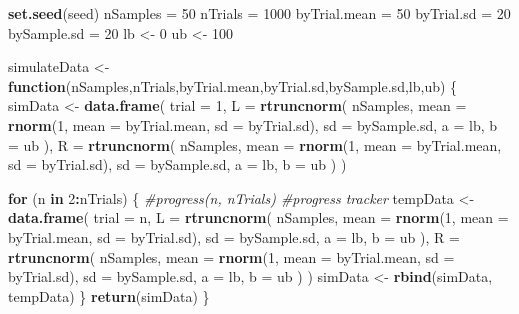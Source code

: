 \documentclass[
]{book}
\newenvironment{Shaded}{\begin{snugshade}}{\end{snugshade}}
\newcommand{\AttributeTok}[1]{\textcolor[rgb]{0.13,0.29,0.53}{#1}}
\newcommand{\CommentTok}[1]{\textcolor[rgb]{0.56,0.35,0.01}{\textit{#1}}}
\newcommand{\ControlFlowTok}[1]{\textcolor[rgb]{0.13,0.29,0.53}{\textbf{#1}}}
\newcommand{\DecValTok}[1]{\textcolor[rgb]{0.00,0.00,0.81}{#1}}
\newcommand{\FunctionTok}[1]{\textcolor[rgb]{0.13,0.29,0.53}{\textbf{#1}}}
\newcommand{\NormalTok}[1]{#1}
\newcommand{\OtherTok}[1]{\textcolor[rgb]{0.56,0.35,0.01}{#1}}
\newcommand{\SpecialCharTok}[1]{\textcolor[rgb]{0.81,0.36,0.00}{\textbf{#1}}}
\begin{document}
\begin{Shaded}
\begin{Highlighting}[]
\FunctionTok{set.seed}\NormalTok{(seed)}
\NormalTok{nSamples }\OtherTok{=} \DecValTok{50}
\NormalTok{nTrials }\OtherTok{=} \DecValTok{1000}
\NormalTok{byTrial.mean }\OtherTok{=} \DecValTok{50}
\NormalTok{byTrial.sd }\OtherTok{=} \DecValTok{20}
\NormalTok{bySample.sd }\OtherTok{=} \DecValTok{20}
\NormalTok{lb }\OtherTok{\textless{}{-}} \DecValTok{0}
\NormalTok{ub }\OtherTok{\textless{}{-}} \DecValTok{100}

\NormalTok{simulateData }\OtherTok{\textless{}{-}} \ControlFlowTok{function}\NormalTok{(nSamples,nTrials,byTrial.mean,byTrial.sd,bySample.sd,lb,ub) \{}
\NormalTok{  simData }\OtherTok{\textless{}{-}} \FunctionTok{data.frame}\NormalTok{(}
    \AttributeTok{trial =} \DecValTok{1}\NormalTok{,}
    \AttributeTok{L =} \FunctionTok{rtruncnorm}\NormalTok{(}
\NormalTok{      nSamples,}
      \AttributeTok{mean =} \FunctionTok{rnorm}\NormalTok{(}\DecValTok{1}\NormalTok{, }\AttributeTok{mean =}\NormalTok{ byTrial.mean, }\AttributeTok{sd =}\NormalTok{ byTrial.sd),}
      \AttributeTok{sd =}\NormalTok{ bySample.sd,}
      \AttributeTok{a =}\NormalTok{ lb,}
      \AttributeTok{b =}\NormalTok{ ub}
\NormalTok{    ),}
    \AttributeTok{R =} \FunctionTok{rtruncnorm}\NormalTok{(}
\NormalTok{      nSamples,}
      \AttributeTok{mean =} \FunctionTok{rnorm}\NormalTok{(}\DecValTok{1}\NormalTok{, }\AttributeTok{mean =}\NormalTok{ byTrial.mean, }\AttributeTok{sd =}\NormalTok{ byTrial.sd),}
      \AttributeTok{sd =}\NormalTok{ bySample.sd,}
      \AttributeTok{a =}\NormalTok{ lb,}
      \AttributeTok{b =}\NormalTok{ ub}
\NormalTok{    )}
\NormalTok{  )}
  
  \ControlFlowTok{for}\NormalTok{ (n }\ControlFlowTok{in} \DecValTok{2}\SpecialCharTok{:}\NormalTok{nTrials) \{}
  \CommentTok{\#progress(n, nTrials) \#progress tracker}
\NormalTok{  tempData }\OtherTok{\textless{}{-}} \FunctionTok{data.frame}\NormalTok{(}
    \AttributeTok{trial =}\NormalTok{ n,}
    \AttributeTok{L =} \FunctionTok{rtruncnorm}\NormalTok{(}
\NormalTok{      nSamples,}
      \AttributeTok{mean =} \FunctionTok{rnorm}\NormalTok{(}\DecValTok{1}\NormalTok{, }\AttributeTok{mean =}\NormalTok{ byTrial.mean, }\AttributeTok{sd =}\NormalTok{ byTrial.sd),}
      \AttributeTok{sd =}\NormalTok{ bySample.sd,}
      \AttributeTok{a =}\NormalTok{ lb,}
      \AttributeTok{b =}\NormalTok{ ub}
\NormalTok{    ),}
    \AttributeTok{R =} \FunctionTok{rtruncnorm}\NormalTok{(}
\NormalTok{      nSamples,}
      \AttributeTok{mean =} \FunctionTok{rnorm}\NormalTok{(}\DecValTok{1}\NormalTok{, }\AttributeTok{mean =}\NormalTok{ byTrial.mean, }\AttributeTok{sd =}\NormalTok{ byTrial.sd),}
      \AttributeTok{sd =}\NormalTok{ bySample.sd,}
      \AttributeTok{a =}\NormalTok{ lb,}
      \AttributeTok{b =}\NormalTok{ ub}
\NormalTok{    )}
\NormalTok{  )}
\NormalTok{  simData }\OtherTok{\textless{}{-}} \FunctionTok{rbind}\NormalTok{(simData, tempData)}
\NormalTok{  \}}
  \FunctionTok{return}\NormalTok{(simData)}
\NormalTok{\}}


\end{Highlighting}
\end{Shaded}
\end{document}
